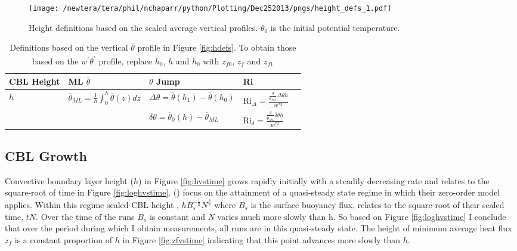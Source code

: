 \begin{figure}[htbp]
    \centering
    \texttt{[image: /newtera/tera/phil/nchaparr/python/Plotting/Dec252013/pngs/height\_defs\_1.pdf]}
    \caption[Height definitions]{Height definitions based on the scaled average vertical profiles. $\theta_{0}$ is the initial potential temperature.}
    \label{fig:hdefs1}   %
\end{figure}

\begin{table}[htbp]
    \begin{center}
    \begin{tabular}{ p{2cm} p{3.5cm}  p{3.5cm}  p{3cm} p{3cm} }
      \acs{CBL} Height & \acs{ML} $\overline{\theta}$ & $\theta$ Jump & \acs{Ri} \\ \hline 
       $h$ & $\overline{\theta}_{ML} = \frac{1}{h}\int^{h}_{0}\overline{\theta}(z)dz$ & $\Delta \theta=\overline{\theta}(h_{1})-\overline{\theta}(h_{0})$ & \acs{Ri}$_{\Delta}=\frac{\frac{g}{\overline{\theta}_{ML}}\Delta \theta h}{w^{*2}}$  \\ [.3cm] %
        
       & &$\delta \theta = \overline{\theta}_{0}(h)- \overline{\theta}_{ML}$ & \acs{Ri}$_{\delta}=\frac{\frac{g}{\overline{\theta}_{ML}} \delta \theta h}{w^{*2}}$ \\ \hline
      \end{tabular}
\caption[Height definitions]{Definitions based on the vertical $\overline{\theta}$ profile in Figure \ref{fig:hdefs}.  To obtain those based on the $\overline{w^{'}\theta^{'}}$ profile, replace $h_{0}$, $h$ and $h_{0}$ with $z_{f0}$, $z_{f}$ and $z_{f1}$}
\label{table:reldefs}   
\end{center}    
\end{table}

\subsection{\acs{CBL} Growth}

Convective boundary layer height ($h$) in Figure \ref{fig:hvstime} grows rapidly initially with a steadily decreasing rate and relates to the square-root of time in Figure \ref{fig:loghvstime}.  \citeauthor{FedConzMir04} (\citeyear{FedConzMir04})
focus on the attainment of a quasi-steady state regime in which their zero-order model applies.  Within this regime scaled \acs{CBL} height , $hB_{s}^{-\frac{1}{2}}N^{\frac{3}{2}}$ where $B_{s}$ is the surface buoyancy flux, relates to the square-root of their scaled time, $tN$. Over the time of the runs $B_{s}$ is constant and $N$ varies much more slowly than h.  So based on Figure \ref{fig:loghvstime} I conclude that over the period during which I obtain measurements, all runs are in this quasi-steady state. The height of minimum average heat flux $z_{f}$ is a constant proportion of $h$ in Figure \ref{fig:zfvstime} indicating that this point advances more slowly than $h$.\\
  

